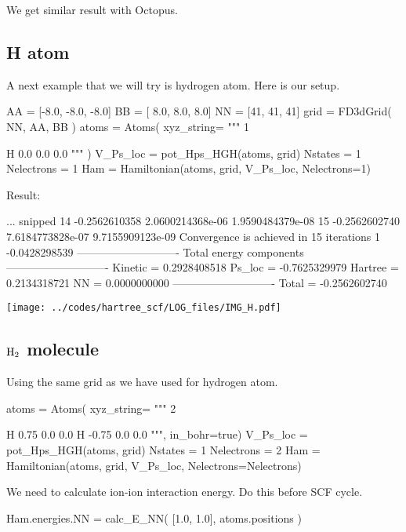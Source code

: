 We get similar result with Octopus.



\subsection{H atom}

A next example that we will try is hydrogen atom. Here is our setup.
\begin{juliacode}
AA = [-8.0, -8.0, -8.0]
BB = [ 8.0,  8.0,  8.0]
NN = [41, 41, 41]
grid = FD3dGrid( NN, AA, BB )
atoms = Atoms( xyz_string=
  """
  1

  H  0.0  0.0  0.0
  """ )
V_Ps_loc = pot_Hps_HGH(atoms, grid)
Nstates = 1
Nelectrons = 1
Ham = Hamiltonian(atoms, grid, V_Ps_loc, Nelectrons=1)
\end{juliacode}

Result:
\begin{textcode}
... snipped
14      -0.2562610358   2.0600214368e-06   1.9590484379e-08
15      -0.2562602740   7.6184773828e-07   9.7155909123e-09
Convergence is achieved in 15 iterations
1      -0.0428298539
----------------------------
Total energy components
----------------------------
Kinetic =       0.2928408518
Ps_loc  =      -0.7625329979
Hartree =       0.2134318721
NN      =       0.0000000000
----------------------------
Total   =      -0.2562602740
\end{textcode}


{\center
\texttt{[image: ../codes/hartree\_scf/LOG\_files/IMG\_H.pdf]}
\par}




\subsection{$\ce{H2}$ molecule}


Using the same grid as we have used for hydrogen atom.

\begin{juliacode}
atoms = Atoms( xyz_string=
  """
  2
  
  H   0.75  0.0  0.0
  H  -0.75  0.0  0.0
  """, in_bohr=true)
V_Ps_loc = pot_Hps_HGH(atoms, grid)
Nstates = 1
Nelectrons = 2
Ham = Hamiltonian(atoms, grid, V_Ps_loc, Nelectrons=Nelectrons)
\end{juliacode}

We need to calculate ion-ion interaction energy. Do this before SCF cycle.
\begin{juliacode}
Ham.energies.NN = calc_E_NN( [1.0, 1.0], atoms.positions )
\end{juliacode}

